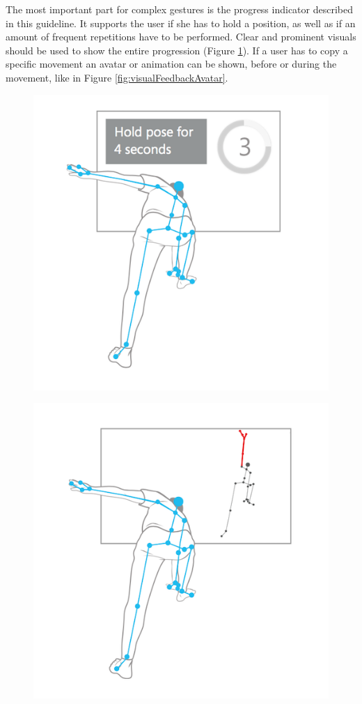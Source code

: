 The most important part for complex gestures is the progress indicator described in this guideline. It supports the user if she has to hold a position, as well as if an amount of frequent repetitions have to be performed. Clear and prominent visuals should be used to show the entire progression (Figure \ref{fig:visualFeedbackIndicator}). If a user has to copy a specific movement an avatar or animation can be shown, before or during the movement, like in Figure \ref{fig:visualFeedbackAvatar}.
\begin{figure}[htb]
	\centering
	\begin{minipage}[t]{0.49\linewidth}
		\centering
		\includegraphics[width=0.9\linewidth]{Pictures/2_4_visualFeedbackIndicator}
		\label{fig:visualFeedbackIndicator}
	\end{minipage}
	\hfill
	\begin{minipage}[t]{0.49\linewidth}
		\centering
		\includegraphics[width=0.9\linewidth]{Pictures/2_4_visualFeedbackAvatar}

\end{minipage}
\end{figure}
